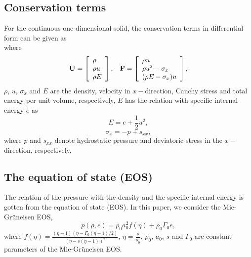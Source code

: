 \documentclass[review]{elsarticle}
\begin{document}
\subsection{Conservation terms}
For  the  continuous one-dimensional solid, the conservation terms  in differential form can be  given as
\begin{equation*}
\end{equation*}
where
\begin{equation}
  \mathbf{U} = \left[ \begin{array}{l}
      \rho \\
      \rho u \\
      \rho  E \\
    \end{array}
  \right],
  \hspace{0.3cm}
  \mathbf{F} = \left[ \begin{array}{l}
      \rho u \\
      \rho u^2 -\sigma_x\\
      (\rho E -\sigma_x)u\\
  \end{array} \right],
\end{equation}
$\rho$, $u$, $\sigma_x$ and $E$ are  the density, velocity in $x-$direction, Cauchy stress and total energy per unit volume, respectively, $E$ has the relation with specific internal energy $e$ as
\begin{equation}
  E = e+\frac{1}{2}u^2,
\end{equation}
\begin{equation}
  \sigma_x = -p +s_{xx},
\end{equation}
where $p$ and $s_{xx}$ denote hydrostatic pressure and deviatoric stress in the $x-$ direction, respectively.

\subsection{The equation of state (EOS)}

The relation of the pressure with  the density and the specific internal energy is gotten from the equation of state (EOS). In this paper, we consider the Mie-Gr\"uneisen EOS,
\begin{equation}\label{eq:mie}
  p(\rho,e) = \rho_0 a_0^2f(\eta)+ \rho_0 \Gamma_0 e,
\end{equation}
where $f(\eta) = \frac{(\eta-1)(\eta-\Gamma_0(\eta-1)/2)}{(\eta-s(\eta-1))^2}$, $\eta = \frac{\rho}{\rho_0}$, $\rho_0$, $a_0$, $s$ and $\Gamma_0$ are constant parameters of the Mie-Gr\"uneisen EOS.
\end{document}
